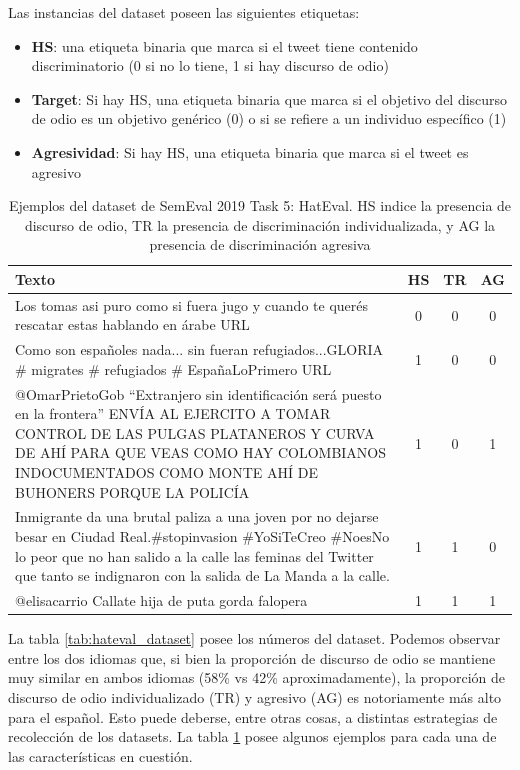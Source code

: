 Las instancias del dataset poseen las siguientes etiquetas:

\begin{itemize}
    \item \textbf{HS}: una etiqueta binaria que marca si el tweet tiene contenido discriminatorio (0 si no lo tiene, 1 si hay discurso de odio)
    \item \textbf{Target}: Si hay HS, una etiqueta binaria que marca si el objetivo del discurso de odio es un objetivo genérico (0) o si se refiere a un individuo específico (1)
    \item \textbf{Agresividad}: Si hay HS, una etiqueta binaria que marca si el tweet es agresivo
\end{itemize}

\begin{table}
    \centering
    \footnotesize
    \begin{tabularx}{\textwidth}{X c c c}
        Texto & HS & TR & AG \\
        \hline
        Los tomas asi puro como si fuera jugo y cuando te querés rescatar estas hablando en árabe URL & 0 & 0 & 0 \\
        Como son españoles nada... sin fueran refugiados...GLORIA \# migrates \# refugiados \# EspañaLoPrimero URL & 1 & 0 & 0 \\
        @OmarPrietoGob ``Extranjero sin identificación será puesto en la frontera'' ENVÍA AL EJERCITO A TOMAR CONTROL DE LAS PULGAS PLATANEROS Y CURVA DE AHÍ PARA QUE VEAS COMO HAY COLOMBIANOS INDOCUMENTADOS COMO MONTE AHÍ DE BUHONERS PORQUE LA POLICÍA & 1 & 0 & 1 \\
        Inmigrante da una brutal paliza a una joven por no dejarse besar en Ciudad Real.\#stopinvasion \#YoSiTeCreo \#NoesNo lo peor que no han salido a la calle las feminas del Twitter que tanto se indignaron con la salida de La Manda a la calle. & 1 & 1 & 0 \\
        @elisacarrio Callate hija de puta gorda falopera & 1 & 1 & 1 \\
        \hline
    \end{tabularx}
    \caption{Ejemplos del dataset de SemEval 2019 Task 5: HatEval. HS indice la presencia de discurso de odio, TR la presencia de discriminación individualizada, y AG la presencia de discriminación agresiva}
    \label{tab:hateval_dataset_examples}
\end{table}


La tabla \ref{tab:hateval_dataset} posee los números del dataset. Podemos observar entre los dos idiomas que, si bien la proporción de discurso de odio se mantiene muy similar en ambos idiomas (58\% vs 42\% aproximadamente), la proporción de discurso de odio individualizado (TR) y agresivo (AG) es notoriamente más alto para el español. Esto puede deberse, entre otras cosas, a distintas estrategias de recolección de los datasets. La tabla \ref{tab:hateval_dataset_examples} posee algunos ejemplos para cada una de las características en cuestión.

